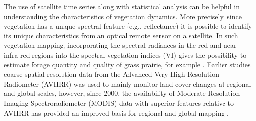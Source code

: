 
The use of satellite time series along with statistical analysis can be helpful in understanding the characteristics of vegetation dynamics.  More precisely, since vegetation has a unique spectral feature (e.g., reflectance) it is possible to identify its unique characteristics from an optical remote sensor on a satellite. In such vegetation mapping, incorporating the spectral radiances in the red and near-infra-red regions into the spectral vegetation indices (VI) gives the possibility to estimate  forage  quantity  and quality  of  grass  prairie, for example \citep{xie_sha_yu_2008}. 
Earlier studies coarse spatial resolution data from the Advanced Very High Resolution Radiometer (AVHRR) was used to mainly monitor land cover changes at regional and global scales, however, since 2000, the availability of Moderate Resolution Imaging Spectroradiometer (MODIS) data with superior features relative to AVHRR has provided an improved basis for regional and global mapping \citep{huang_2014}.






